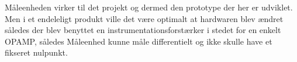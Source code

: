 
Måleenheden virker til det projekt og dermed den prototype der her er udviklet. Men i et endeleligt produkt ville det være optimalt at hardwaren blev ændret således der blev benyttet en instrumentationsforstærker i stedet for en enkelt OPAMP, således Måleenhed kunne måle differentielt og ikke skulle have et fikseret nulpunkt. 